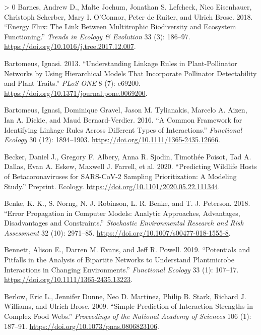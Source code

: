 \documentclass[11pt]{article}
\newlength{\cslhangindent}
\newenvironment{CSLReferences}[3] %
 {%
  \setlength{\parindent}{0pt}
  \ifodd #1 \everypar{\setlength{\hangindent}{\cslhangindent}}\ignorespaces\fi
  \ifnum #2 > 0
  \setlength{\parskip}{#2\baselineskip}
  \fi
 }%
 {}
\begin{document}
\begin{CSLReferences}{1}{0}
\leavevmode\hypertarget{ref-Barnes2018EneFlu}{}%
Barnes, Andrew D., Malte Jochum, Jonathan S. Lefcheck, Nico Eisenhauer,
Christoph Scherber, Mary I. O'Connor, Peter de Ruiter, and Ulrich Brose.
2018. {``Energy Flux: The Link Between Multitrophic Biodiversity and
Ecosystem Functioning.''} \emph{Trends in Ecology \& Evolution} 33 (3):
186--97. \url{https://doi.org/10.1016/j.tree.2017.12.007}.

\leavevmode\hypertarget{ref-Bartomeus2013UndLin}{}%
Bartomeus, Ignasi. 2013. {``Understanding Linkage Rules in
Plant-Pollinator Networks by Using Hierarchical Models That Incorporate
Pollinator Detectability and Plant Traits.''} \emph{PLoS ONE} 8 (7):
e69200. \url{https://doi.org/10.1371/journal.pone.0069200}.

\leavevmode\hypertarget{ref-Bartomeus2016ComFra}{}%
Bartomeus, Ignasi, Dominique Gravel, Jason M. Tylianakis, Marcelo A.
Aizen, Ian A. Dickie, and Maud Bernard-Verdier. 2016. {``A Common
Framework for Identifying Linkage Rules Across Different Types of
Interactions.''} \emph{Functional Ecology} 30 (12): 1894--1903.
\url{https://doi.org/10.1111/1365-2435.12666}.

\leavevmode\hypertarget{ref-Becker2020PreWil}{}%
Becker, Daniel J., Gregory F. Albery, Anna R. Sjodin, Timothée Poisot,
Tad A. Dallas, Evan A. Eskew, Maxwell J. Farrell, et al. 2020.
{``Predicting Wildlife Hosts of Betacoronaviruses for SARS-CoV-2
Sampling Prioritization: A Modeling Study.''} Preprint. Ecology.
\url{https://doi.org/10.1101/2020.05.22.111344}.

\leavevmode\hypertarget{ref-Benke2018ErrPro}{}%
Benke, K. K., S. Norng, N. J. Robinson, L. R. Benke, and T. J. Peterson.
2018. {``Error Propagation in Computer Models: Analytic Approaches,
Advantages, Disadvantages and Constraints.''} \emph{Stochastic
Environmental Research and Risk Assessment} 32 (10): 2971--85.
\url{https://doi.org/10.1007/s00477-018-1555-8}.

\leavevmode\hypertarget{ref-Bennett2019PotPit}{}%
Bennett, Alison E., Darren M. Evans, and Jeff R. Powell. 2019.
{``Potentials and Pitfalls in the Analysis of Bipartite Networks to
Understand Plantmicrobe Interactions in Changing Environments.''}
\emph{Functional Ecology} 33 (1): 107--17.
\url{https://doi.org/10.1111/1365-2435.13223}.

\leavevmode\hypertarget{ref-Berlow2009SimPre}{}%
Berlow, Eric L., Jennifer Dunne, Neo D. Martinez, Philip B. Stark,
Richard J. Williams, and Ulrich Brose. 2009. {``Simple Prediction of
Interaction Strengths in Complex Food Webs.''} \emph{Proceedings of the
National Academy of Sciences} 106 (1): 187--91.
\url{https://doi.org/10.1073/pnas.0806823106}.


\end{CSLReferences}
\end{document}
